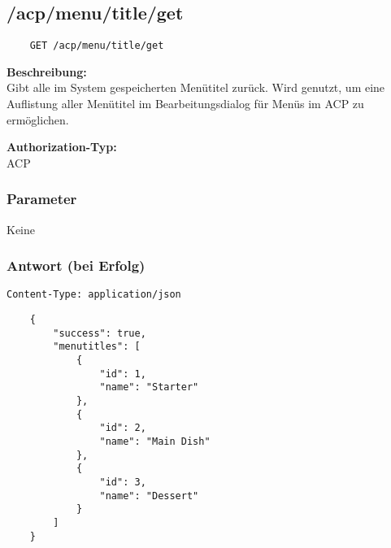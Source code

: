 \subsection{/acp/menu/title/get}

\begin{lstlisting}
    GET /acp/menu/title/get
\end{lstlisting}

\textbf{Beschreibung:} \\
Gibt alle im System gespeicherten Menütitel zurück. Wird genutzt, um eine Auflistung aller Menütitel im Bearbeitungsdialog für Menüs im ACP zu ermöglichen.

\textbf{Authorization-Typ:} \\
ACP

\subsubsection{Parameter}
Keine

\subsubsection{Antwort (bei Erfolg)}

\lstinline{Content-Type: application/json}
\begin{lstlisting}
    {
        "success": true, 
        "menutitles": [
            {
                "id": 1,
                "name": "Starter"
            },
            {
                "id": 2,
                "name": "Main Dish"
            },
            {
                "id": 3,
                "name": "Dessert"
            }
        ]
    }
\end{lstlisting}
